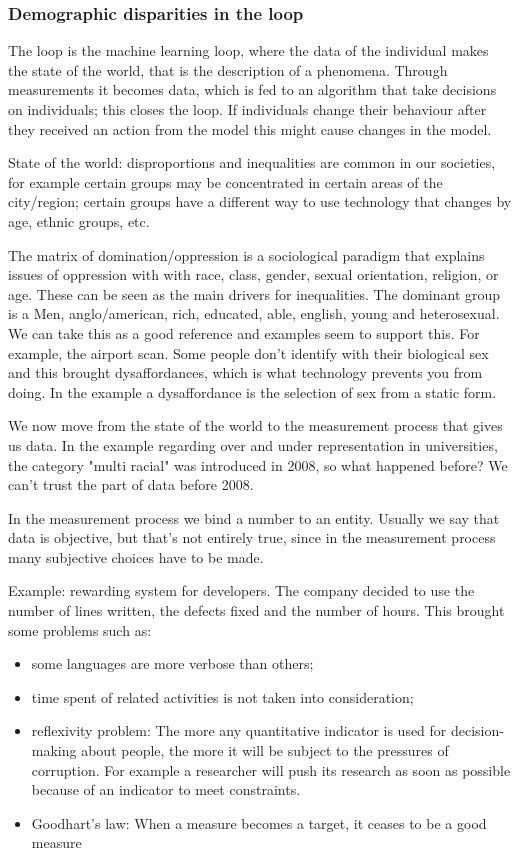 \subsubsection{Demographic disparities in the loop}
The loop is the machine learning loop, where the data of the individual makes the state of the world, that is the description of a phenomena. Through measurements it becomes data, which is fed to an algorithm that take decisions on individuals; this closes the loop. If individuals change their behaviour after they received an action from the model this might cause changes in the model. 

State of the world: disproportions and inequalities are common in our societies, for example certain groups may be concentrated in certain areas of the city/region; certain groups have a different way to use technology that changes by age, ethnic groups, etc. 

The matrix of domination/oppression is a sociological paradigm that explains issues of oppression with with race, class, gender, sexual orientation, religion, or age. These can be seen as the main drivers for inequalities. The dominant group is a Men, anglo/american, rich, educated, able, english, young and heterosexual. We can take this as a good reference and examples seem to support this. For example, the airport scan. Some people don't identify with their biological sex and this brought dysaffordances, which is what technology prevents you from doing. In the example a dysaffordance is the selection of sex from a static form.

We now move from the state of the world to the measurement process that gives us data. In the example regarding over and under representation in universities, the category "multi racial" was introduced in 2008, so what happened before? We can't trust the part of data before 2008. 

In the measurement process we bind a number to an entity. Usually we say that data is objective, but that's not entirely true, since in the measurement process many subjective choices have to be made.

Example: rewarding system for developers. The company decided to use the number of lines written,  the defects fixed and the number of hours. This brought some problems such as:
\begin{itemize}
    \item some languages are more verbose than others;
    \item time spent of related activities is not taken into consideration;
    \item reflexivity problem: The more any quantitative indicator is used for decision-making about people, the more it will be subject to the pressures of corruption. For example a researcher will push its research as soon as possible because of an indicator to meet constraints.
    \item Goodhart's law: When a measure becomes a target, it ceases to be a good measure
\end{itemize}

